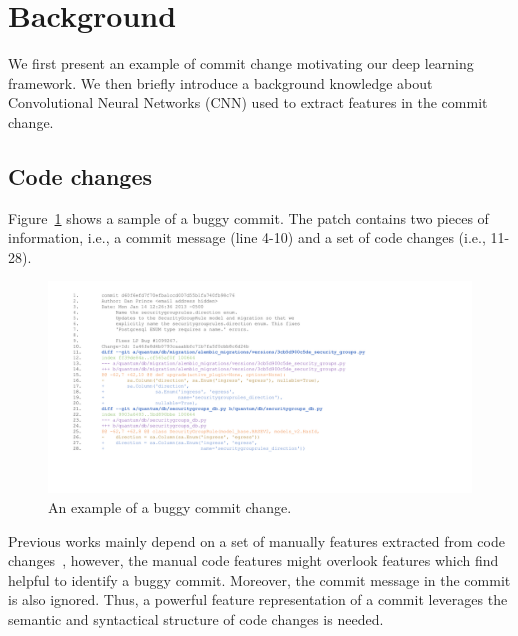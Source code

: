 

\section{Background}\label{sec:background}


We first present an example of commit change motivating our deep learning framework. We then briefly introduce a background knowledge about Convolutional Neural Networks (CNN) used to extract features in the commit change. 

\subsection{Code changes}\label{sec:examle}

Figure~\ref{fig:example} shows a sample of a buggy commit. The patch contains two pieces of information, i.e., a commit message (line 4-10) and a set of code changes (i.e., 11-28). 


\begin{figure}[ht]
\center
\includegraphics[scale=0.27]{figs/example.pdf}
\caption{An example of a buggy commit change.}
\label{fig:example}
\end{figure} 



Previous works mainly depend on a set of manually features extracted from code changes~\cite{Yang:2015:DLJ, mcintosh2018fix}, however, the manual code features might overlook features which find helpful to identify a buggy commit. Moreover, the commit message in the commit is also ignored. Thus, a powerful feature representation of a commit leverages the semantic and syntactical structure of code changes is needed. 

